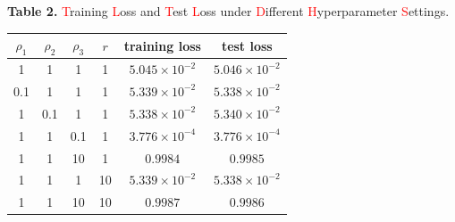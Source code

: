 \documentclass[twoside]{article}
\begin{document}
\begin{multicols}{2}
\tabcolsep 9pt
\renewcommand\arraystretch{1.3}
\begin{center}
{\footnotesize{\bf Table 2.} \textcolor{red}{T}raining \textcolor{red}{L}oss and \textcolor{red}{T}est \textcolor{red}{L}oss under \textcolor{red}{D}ifferent \textcolor{red}{H}yperparameter \textcolor{red}{S}ettings.}\\
\vspace{2mm}
\footnotesize{
\begin{tabular*}{\linewidth}{cccccc}\hline\hline\hline
$\rho_1$ & $\rho_2$ & $\rho_3$ & $r$ & training loss & test loss  \\
\hline
1 & 1 & 1 & 1       & $5.045\times10^{-2}$  & $5.046\times10^{-2}$   \\
0.1 & 1 & 1 & 1    & $5.339\times10^{-2}$  & $5.338\times10^{-2}$   \\
1 & 0.1 & 1 & 1     & $5.338\times10^{-2}$      & $5.340\times10^{-2}$     \\
1 &1 & 0.1 & 1   & $3.776\times10^{-4}$  & $3.776\times10^{-4}$      \\
1 &1 & 10  & 1            & $0.9984$  & $0.9985$     \\
1 & 1 & 1 & 10   &  $5.339\times10^{-2}$     &  $5.338\times10^{-2}$    \\
1 & 1 & 10 & 10         & $0.9987$   & $0.9986$      \\
\hline\hline\hline
\end{tabular*}%
}
\label{tab:hyper loss}
\end{center}



\end{multicols}
\end{document}
